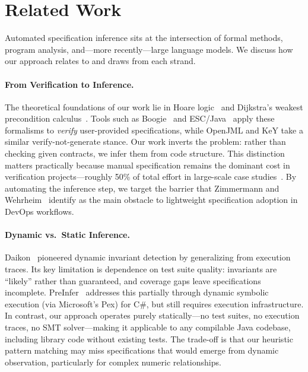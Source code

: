 \section{Related Work}
\label{sec:related}

Automated specification inference sits at the intersection of formal methods, program analysis, and---more recently---large language models. We discuss how our approach relates to and draws from each strand.

\paragraph{From Verification to Inference.}
The theoretical foundations of our work lie in Hoare logic~\cite{hoare1969axiomatic} and Dijkstra's weakest precondition calculus~\cite{dijkstra_guarded_1975, dijkstra1976discipline}. Tools such as Boogie~\cite{barnett2005weakest} and ESC/Java~\cite{flanagan2002extended, chalin2010jml} apply these formalisms to \emph{verify} user-provided specifications, while OpenJML and KeY take a similar verify-not-generate stance. Our work inverts the problem: rather than checking given contracts, we infer them from code structure. This distinction matters practically because manual specification remains the dominant cost in verification projects---roughly 50\% of total effort in large-scale case studies~\cite{andronick_large-scale_2012, klein2014sel4, matichuk_cost_2015}. By automating the inference step, we target the barrier that Zimmermann and Wehrheim~\cite{zimmermann2019lightweight} identify as the main obstacle to lightweight specification adoption in DevOps workflows.

\paragraph{Dynamic vs.\ Static Inference.}
Daikon~\cite{ernst2007daikon} pioneered dynamic invariant detection by generalizing from execution traces. Its key limitation is dependence on test suite quality: invariants are ``likely'' rather than guaranteed, and coverage gaps leave specifications incomplete. PreInfer~\cite{preinfer2017} addresses this partially through dynamic symbolic execution (via Microsoft's Pex) for C\#, but still requires execution infrastructure. In contrast, our approach operates purely statically---no test suites, no execution traces, no SMT solver---making it applicable to any compilable Java codebase, including library code without existing tests. The trade-off is that our heuristic pattern matching may miss specifications that would emerge from dynamic observation, particularly for complex numeric relationships.

